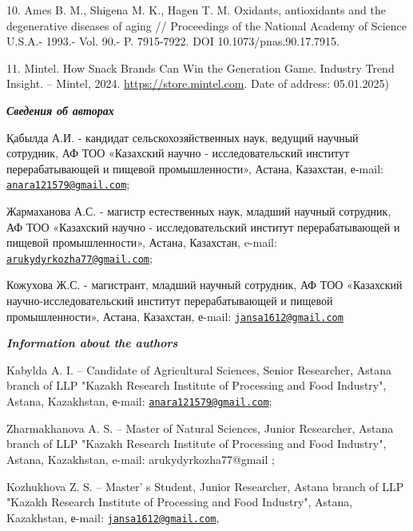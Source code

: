 \begin{references}
10. Ames B. M., Shigena M. K., Hagen T. M. Oxidants, antioxidants and the
degenerative diseases of aging // Proceedings of the National Academy of
Science U.S.A.- 1993.- Vol. 90.- P. 7915-7922. DOI
10.1073/pnas.90.17.7915.

11. Mintel. How Snack Brands Can Win the Generation Game. Industry Trend
Insight. -- Mintel,
2024. \href{https://store.mintel.com/report/how-snack-brands-can-win-the-generation-game}{https://store.mintel.com}.
Date of address: 05.01.2025)
\end{references}

\begin{authorinfo}
\emph{{\bfseries Сведения об авторах}}

Қабылда А.И. - кандидат сельскохозяйственных наук, ведущий научный
сотрудник, АФ ТОО «Казахский научно - исследовательский институт
перерабатывающей и пищевой промышленности», Астана, Казахстан, е-mail:\\
\href{mailto:anara121579@gmail.com}{\nolinkurl{anara121579@gmail.com}};

Жармаханова А.С. - магистр естественных наук, младший научный сотрудник,
АФ ТОО «Казахский научно - исследовательский институт перерабатывающей и
пищевой промышленности», Астана, Казахстан, e-mail:\\
\href{mailto:arukydyrkozha77@gmail.com}{\nolinkurl{arukydyrkozha77@gmail.com}};

Кожухова Ж.С. - магистрант, младший научный сотрудник, АФ ТОО «Казахский
научно-исследовательский институт перерабатывающей и пищевой
промышленности», Астана, Казахстан, е-mail:
\href{mailto:jansa1612@gmail.com}{\nolinkurl{jansa1612@gmail.com}}

\emph{{\bfseries Information about the authors}}

Kabylda A. I. -- Candidate of Agricultural Sciences, Senior Researcher,
Astana branch of LLP "Kazakh Research Institute of Processing and Food
Industry", Astana, Kazakhstan, е-mail:
\href{mailto:anara121579@gmail.com}{\nolinkurl{anara121579@gmail.com}};

Zharmakhanova A. S. -- Master of Natural Sciences, Junior Researcher,
Astana branch of LLP "Kazakh Research Institute of Processing and Food
Industry", Astana, Kazakhstan, e-mail: arukydyrkozha77@gmail ;

Kozhukhova Z. S. -- Master' s Student, Junior Researcher,
Astana branch of LLP "Kazakh Research Institute of Processing and Food
Industry", Astana, Kazakhstan, е-mail:
\href{mailto:jansa1612@gmail.com}{\nolinkurl{jansa1612@gmail.com}},
\end{authorinfo}
